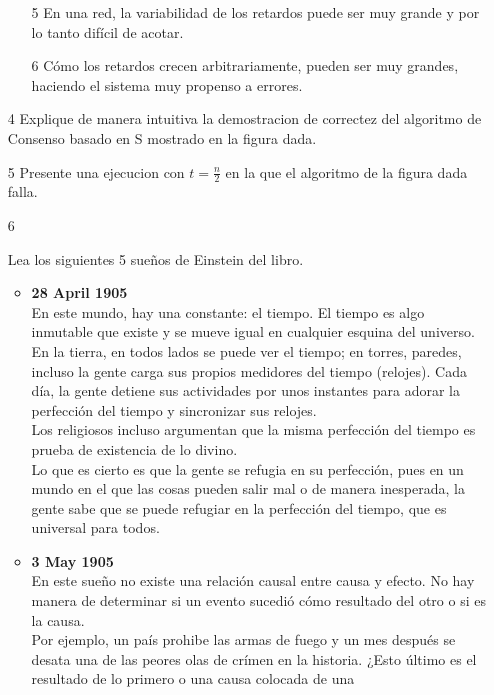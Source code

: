 \documentclass[12pt,a4paper]{report}
\begin{document}
\begin{itemize}
{\begin{itemize}
        \item[5]{En una red, la variabilidad de los retardos puede ser muy
            grande y por lo tanto difícil de acotar.}
        \item[6]{Cómo los retardos crecen arbitrariamente, pueden ser muy
            grandes, haciendo el sistema muy propenso a errores.}
    \end{itemize}
}
\item[4]{Explique de manera intuitiva la demostracion de correctez del
    algoritmo de Consenso basado en S mostrado en la figura dada.
}
\item[5]{Presente una ejecucion con $t=\tfrac{n}{2}$ en la que el algoritmo
    de la figura dada falla.
}
\item[6]{Lea los siguientes 5 sueños de Einstein del libro.
    \begin{itemize}[label=$\bullet$]
        \item{\textbf{28 April 1905}\\
            En este mundo, hay una constante: el tiempo. El tiempo es algo
            inmutable que existe y se mueve igual en cualquier esquina del
            universo. En la tierra, en todos lados se puede ver el tiempo; en
            torres, paredes, incluso la gente carga sus propios medidores del
            tiempo (relojes). Cada día, la gente detiene sus actividades por
            unos instantes para adorar la perfección del tiempo y sincronizar
            sus relojes.\\
            Los religiosos incluso argumentan que la misma perfección del tiempo
            es prueba de existencia de lo divino.\\
            Lo que es cierto es que la gente se refugia en su perfección, pues
            en un mundo en el que las cosas pueden salir mal o de manera
            inesperada, la gente sabe que se puede refugiar en la perfección del
            tiempo, que es universal para todos.
        }
        \item{\textbf{3 May 1905}\\
            En este sueño no existe una relación causal entre causa y efecto. No
            hay manera de determinar si un evento sucedió cómo resultado del
            otro o si es la causa.\\
            Por ejemplo, un país prohibe las armas de fuego y un mes después se
            desata una de las peores olas de crímen en la historia. ¿Esto
            último es el resultado de lo primero o una causa colocada de una
}
\end{itemize}}
\end{itemize}
\end{document}
